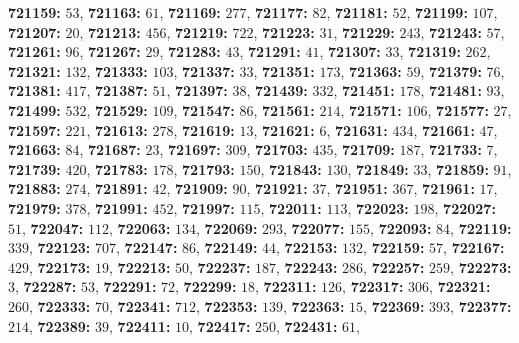 \textsf{\bfseries 721159:} $53$, \textsf{\bfseries 721163:} $61$, \textsf{\bfseries 721169:} $277$, \textsf{\bfseries 721177:} $82$, \textsf{\bfseries 721181:} $52$, \textsf{\bfseries 721199:} $107$, \textsf{\bfseries 721207:} $20$, \textsf{\bfseries 721213:} $456$, \textsf{\bfseries 721219:} $722$, \textsf{\bfseries 721223:} $31$, \textsf{\bfseries 721229:} $243$, \textsf{\bfseries 721243:} $57$, \textsf{\bfseries 721261:} $96$, \textsf{\bfseries 721267:} $29$, \textsf{\bfseries 721283:} $43$, \textsf{\bfseries 721291:} $41$, \textsf{\bfseries 721307:} $33$, \textsf{\bfseries 721319:} $262$, \textsf{\bfseries 721321:} $132$, \textsf{\bfseries 721333:} $103$, \textsf{\bfseries 721337:} $33$, \textsf{\bfseries 721351:} $173$, \textsf{\bfseries 721363:} $59$, \textsf{\bfseries 721379:} $76$, \textsf{\bfseries 721381:} $417$, \textsf{\bfseries 721387:} $51$, \textsf{\bfseries 721397:} $38$, \textsf{\bfseries 721439:} $332$, \textsf{\bfseries 721451:} $178$, \textsf{\bfseries 721481:} $93$, \textsf{\bfseries 721499:} $532$, \textsf{\bfseries 721529:} $109$, \textsf{\bfseries 721547:} $86$, \textsf{\bfseries 721561:} $214$, \textsf{\bfseries 721571:} $106$, \textsf{\bfseries 721577:} $27$, \textsf{\bfseries 721597:} $221$, \textsf{\bfseries 721613:} $278$, \textsf{\bfseries 721619:} $13$, \textsf{\bfseries 721621:} $6$, \textsf{\bfseries 721631:} $434$, \textsf{\bfseries 721661:} $47$, \textsf{\bfseries 721663:} $84$, \textsf{\bfseries 721687:} $23$, \textsf{\bfseries 721697:} $309$, \textsf{\bfseries 721703:} $435$, \textsf{\bfseries 721709:} $187$, \textsf{\bfseries 721733:} $7$, \textsf{\bfseries 721739:} $420$, \textsf{\bfseries 721783:} $178$, \textsf{\bfseries 721793:} $150$, \textsf{\bfseries 721843:} $130$, \textsf{\bfseries 721849:} $33$, \textsf{\bfseries 721859:} $91$, \textsf{\bfseries 721883:} $274$, \textsf{\bfseries 721891:} $42$, \textsf{\bfseries 721909:} $90$, \textsf{\bfseries 721921:} $37$, \textsf{\bfseries 721951:} $367$, \textsf{\bfseries 721961:} $17$, \textsf{\bfseries 721979:} $378$, \textsf{\bfseries 721991:} $452$, \textsf{\bfseries 721997:} $115$, \textsf{\bfseries 722011:} $113$, \textsf{\bfseries 722023:} $198$, \textsf{\bfseries 722027:} $51$, \textsf{\bfseries 722047:} $112$, \textsf{\bfseries 722063:} $134$, \textsf{\bfseries 722069:} $293$, \textsf{\bfseries 722077:} $155$, \textsf{\bfseries 722093:} $84$, \textsf{\bfseries 722119:} $339$, \textsf{\bfseries 722123:} $707$, \textsf{\bfseries 722147:} $86$, \textsf{\bfseries 722149:} $44$, \textsf{\bfseries 722153:} $132$, \textsf{\bfseries 722159:} $57$, \textsf{\bfseries 722167:} $429$, \textsf{\bfseries 722173:} $19$, \textsf{\bfseries 722213:} $50$, \textsf{\bfseries 722237:} $187$, \textsf{\bfseries 722243:} $286$, \textsf{\bfseries 722257:} $259$, \textsf{\bfseries 722273:} $3$, \textsf{\bfseries 722287:} $53$, \textsf{\bfseries 722291:} $72$, \textsf{\bfseries 722299:} $18$, \textsf{\bfseries 722311:} $126$, \textsf{\bfseries 722317:} $306$, \textsf{\bfseries 722321:} $260$, \textsf{\bfseries 722333:} $70$, \textsf{\bfseries 722341:} $712$, \textsf{\bfseries 722353:} $139$, \textsf{\bfseries 722363:} $15$, \textsf{\bfseries 722369:} $393$, \textsf{\bfseries 722377:} $214$, \textsf{\bfseries 722389:} $39$, \textsf{\bfseries 722411:} $10$, \textsf{\bfseries 722417:} $250$, \textsf{\bfseries 722431:} $61$, 
